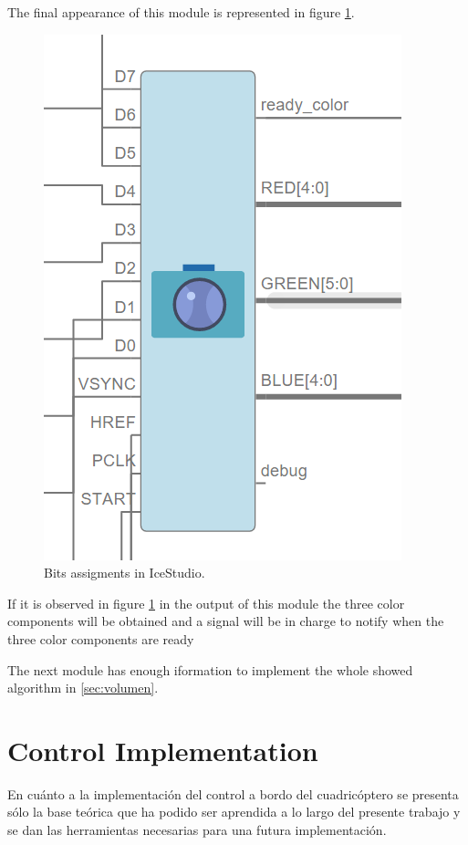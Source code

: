 	The final appearance of this module is represented in figure \ref{fig:assign_bits}.
	
		\begin{figure}[H]
		\center
		\includegraphics[scale=0.6, angle=0]{imagenes/Cuadricoptero_vision/assign_bits}
		\caption{Bits assigments in IceStudio.}
		\label{fig:assign_bits}
	\end{figure}
	
 
 	 If it is observed in figure \ref{fig:assign_bits} in the output of this module the three color components will be obtained and a signal will be in charge to notify when the three color components are ready\newline
	
	The next module has enough iformation to implement the whole showed algorithm in \ref{sec:volumen}.

\section{Control Implementation}

En cuánto a la implementación del control a bordo del cuadricóptero se presenta sólo la base teórica que ha podido ser aprendida a lo largo del presente trabajo y se dan las herramientas necesarias para una futura implementación. \newline

